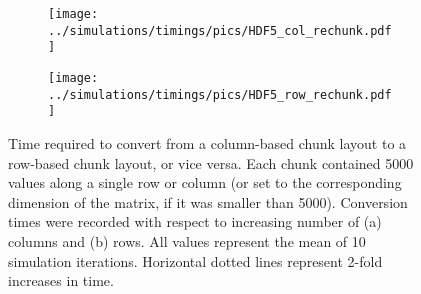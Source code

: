 \documentclass{article}
\begin{document}
\begin{figure}[bt]
    \begin{subfigure}[bt]{0.49\textwidth}
        \texttt{[image: ../simulations/timings/pics/HDF5\_col\_rechunk.pdf]}
        \caption{}
    \end{subfigure}
    \begin{subfigure}[bt]{0.49\textwidth}
        \texttt{[image: ../simulations/timings/pics/HDF5\_row\_rechunk.pdf]}
        \caption{}
    \end{subfigure}
    \caption{Time required to convert from a column-based chunk layout to a row-based chunk layout, or vice versa.
        Each chunk contained 5000 values along a single row or column (or set to the corresponding dimension of the matrix, if it was smaller than 5000).
        Conversion times were recorded with respect to increasing number of (a) columns and (b) rows.
        All values represent the mean of 10 simulation iterations.
        Horizontal dotted lines represent 2-fold increases in time.
    }
    \label{fig:hdf5rechunk}
\end{figure}

\end{document}
